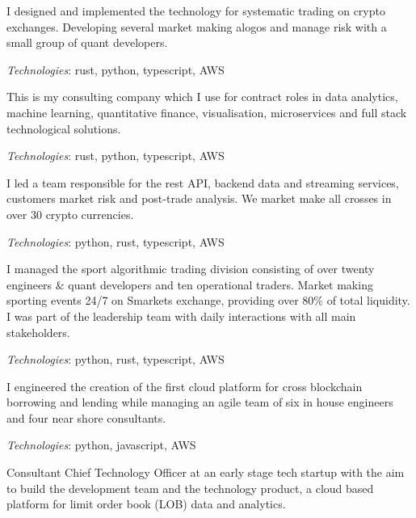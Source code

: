 
I designed and implemented the technology for systematic trading on crypto exchanges.
Developing several market making alogos and manage risk with a small group of quant developers.

{\it Technologies}: rust, python, typescript, AWS


This is my consulting company which I use for contract roles in data analytics, machine learning, quantitative finance,
visualisation, microservices and full stack technological solutions.

{\it Technologies}: rust, python, typescript, AWS


I led a team responsible for the rest API,
backend data and streaming services, customers market risk and post-trade analysis.
We market make all crosses in over 30 crypto currencies.

{\it Technologies}: python, rust, typescript, AWS


I managed the sport algorithmic trading division consisting of over twenty engineers \& quant developers and ten operational traders.
Market making sporting events 24/7 on Smarkets exchange, providing over 80\% of total liquidity.
I was part of the leadership team with daily interactions with all main stakeholders.

{\it Technologies}: python, rust, typescript, AWS


I engineered the creation of the first cloud platform for cross blockchain borrowing and lending
while managing an agile team of six in house engineers and four near shore consultants.

{\it Technologies}: python, javascript, AWS



Consultant Chief Technology Officer at an early stage tech startup with the aim to build the development team and the technology product,
a cloud based platform for limit order book (LOB) data and analytics.

